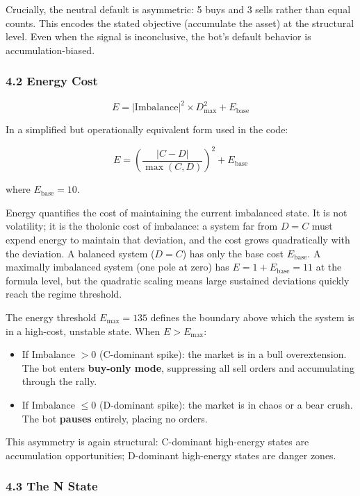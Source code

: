 \documentclass[
  11pt,
  letterpaper,
]{article}
\providecommand{\tightlist}{%
  \setlength{\itemsep}{0pt}\setlength{\parskip}{0pt}}
\begin{document}
Crucially, the neutral default is asymmetric: 5 buys and 3 sells rather
than equal counts. This encodes the stated objective (accumulate the
asset) at the structural level. Even when the signal is inconclusive,
the bot's default behavior is accumulation-biased.

\subsubsection{4.2 Energy Cost}\label{energy-cost}

\[E = |\text{Imbalance}|^2 \times D_{\text{max}}^2 + E_{\text{base}}\]

In a simplified but operationally equivalent form used in the code:

\[E = \left(\frac{|C - D|}{\max(C, D)}\right)^2 + E_{\text{base}}\]

where \(E_{\text{base}} = 10\).

Energy quantifies the cost of maintaining the current imbalanced state.
It is not volatility; it is the tholonic cost of imbalance: a system far
from \(D = C\) must expend energy to maintain that deviation, and the
cost grows quadratically with the deviation. A balanced system
(\(D = C\)) has only the base cost \(E_{\text{base}}\). A maximally
imbalanced system (one pole at zero) has
\(E = 1 + E_{\text{base}} = 11\) at the formula level, but the quadratic
scaling means large sustained deviations quickly reach the regime
threshold.

The energy threshold \(E_{\text{max}} = 135\) defines the boundary above
which the system is in a high-cost, unstable state. When
\(E > E_{\text{max}}\):

\begin{itemize}
\tightlist
\item
  If Imbalance \(> 0\) (C-dominant spike): the market is in a bull
  overextension. The bot enters \textbf{buy-only mode}, suppressing all
  sell orders and accumulating through the rally.
\item
  If Imbalance \(\leq 0\) (D-dominant spike): the market is in chaos or
  a bear crush. The bot \textbf{pauses} entirely, placing no orders.
\end{itemize}

This asymmetry is again structural: C-dominant high-energy states are
accumulation opportunities; D-dominant high-energy states are danger
zones.

\subsubsection{4.3 The N State}\label{the-n-state}
\end{document}
